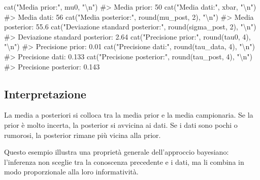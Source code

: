 \documentclass[
  italian,
  letterpaper,
  a4paper,
  11pt,
  open=any]{scrbook}
\newenvironment{Shaded}{\begin{snugshade}}{\end{snugshade}}
\newcommand{\CommentTok}[1]{\textcolor[rgb]{0.37,0.37,0.37}{#1}}
\newcommand{\DecValTok}[1]{\textcolor[rgb]{0.68,0.00,0.00}{#1}}
\newcommand{\FunctionTok}[1]{\textcolor[rgb]{0.28,0.35,0.67}{#1}}
\newcommand{\NormalTok}[1]{\textcolor[rgb]{0.00,0.23,0.31}{#1}}
\newcommand{\SpecialCharTok}[1]{\textcolor[rgb]{0.37,0.37,0.37}{#1}}
\newcommand{\StringTok}[1]{\textcolor[rgb]{0.13,0.47,0.30}{#1}}
\theoremstyle{plain}
\theoremstyle{definition}
\theoremstyle{definition}
\theoremstyle{remark}
\begin{document}
\begin{Shaded}
\begin{Highlighting}[]
\FunctionTok{cat}\NormalTok{(}\StringTok{"Media prior:"}\NormalTok{, mu0, }\StringTok{"}\SpecialCharTok{\textbackslash{}n}\StringTok{"}\NormalTok{)}
\CommentTok{\#\textgreater{} Media prior: 50}
\FunctionTok{cat}\NormalTok{(}\StringTok{"Media dati:"}\NormalTok{, xbar, }\StringTok{"}\SpecialCharTok{\textbackslash{}n}\StringTok{"}\NormalTok{)}
\CommentTok{\#\textgreater{} Media dati: 56}
\FunctionTok{cat}\NormalTok{(}\StringTok{"Media posterior:"}\NormalTok{, }\FunctionTok{round}\NormalTok{(mu\_post, }\DecValTok{2}\NormalTok{), }\StringTok{"}\SpecialCharTok{\textbackslash{}n}\StringTok{"}\NormalTok{)}
\CommentTok{\#\textgreater{} Media posterior: 55.6}
\FunctionTok{cat}\NormalTok{(}\StringTok{"Deviazione standard posterior:"}\NormalTok{, }\FunctionTok{round}\NormalTok{(sigma\_post, }\DecValTok{2}\NormalTok{), }\StringTok{"}\SpecialCharTok{\textbackslash{}n}\StringTok{"}\NormalTok{)}
\CommentTok{\#\textgreater{} Deviazione standard posterior: 2.64}
\FunctionTok{cat}\NormalTok{(}\StringTok{"Precisione prior:"}\NormalTok{, }\FunctionTok{round}\NormalTok{(tau0, }\DecValTok{4}\NormalTok{), }\StringTok{"}\SpecialCharTok{\textbackslash{}n}\StringTok{"}\NormalTok{)}
\CommentTok{\#\textgreater{} Precisione prior: 0.01}
\FunctionTok{cat}\NormalTok{(}\StringTok{"Precisione dati:"}\NormalTok{, }\FunctionTok{round}\NormalTok{(tau\_data, }\DecValTok{4}\NormalTok{), }\StringTok{"}\SpecialCharTok{\textbackslash{}n}\StringTok{"}\NormalTok{)}
\CommentTok{\#\textgreater{} Precisione dati: 0.133}
\FunctionTok{cat}\NormalTok{(}\StringTok{"Precisione posterior:"}\NormalTok{, }\FunctionTok{round}\NormalTok{(tau\_post, }\DecValTok{4}\NormalTok{), }\StringTok{"}\SpecialCharTok{\textbackslash{}n}\StringTok{"}\NormalTok{)}
\CommentTok{\#\textgreater{} Precisione posterior: 0.143}
\end{Highlighting}
\end{Shaded}

\subsection{Interpretazione}\label{interpretazione-3}

La media a posteriori si colloca tra la media prior e la media
campionaria. Se la prior è molto incerta, la posterior si avvicina ai
dati. Se i dati sono pochi o rumorosi, la posterior rimane più vicina
alla prior.

Questo esempio illustra una proprietà generale dell'approccio bayesiano:
l'inferenza non sceglie tra la conoscenza precedente e i dati, ma li
combina in modo proporzionale alla loro informatività.
\end{document}
